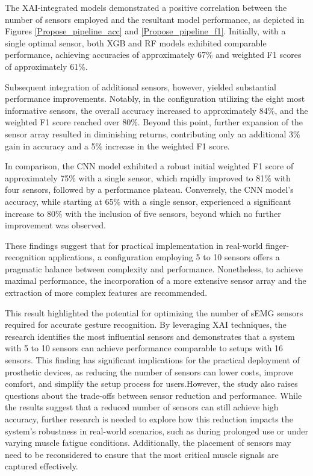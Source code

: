 \documentclass[preprint,12pt]{elsarticle}
\begin{document}
The XAI-integrated models demonstrated a positive correlation between the number of sensors employed and the resultant model performance, as depicted in Figures \ref{Propose_pipeline_acc} and \ref{Propose_pipeline_f1}. Initially, with a single optimal sensor, both XGB and RF models exhibited comparable performance, achieving accuracies of approximately 67\% and weighted F1 scores of approximately 61\%.

Subsequent integration of additional sensors, however, yielded substantial performance improvements. Notably, in the configuration utilizing the eight most informative sensors, the overall accuracy increased to approximately 84\%, and the weighted F1 score reached over 80\%. Beyond this point, further expansion of the sensor array resulted in diminishing returns, contributing only an additional 3\% gain in accuracy and a 5\% increase in the weighted F1 score.

In comparison, the CNN model exhibited a robust initial weighted F1 score of approximately 75\% with a single sensor, which rapidly improved to 81\% with four sensors, followed by a performance plateau. Conversely, the CNN model's accuracy, while starting at 65\% with a single sensor, experienced a significant increase to 80\% with the inclusion of five sensors, beyond which no further improvement was observed.

These findings suggest that for practical implementation in real-world finger-recognition applications, a configuration employing 5 to 10 sensors offers a pragmatic balance between complexity and performance. Nonetheless, to achieve maximal performance, the incorporation of a more extensive sensor array and the extraction of more complex features are recommended.

This result highlighted the potential for optimizing the number of sEMG sensors required for accurate gesture recognition. By leveraging XAI techniques, the research identifies the most influential sensors and demonstrates that a system with 5 to 10 sensors can achieve performance comparable to setups with 16 sensors. This finding has significant implications for the practical deployment of prosthetic devices, as reducing the number of sensors can lower costs, improve comfort, and simplify the setup process for users.However, the study also raises questions about the trade-offs between sensor reduction and performance. While the results suggest that a reduced number of sensors can still achieve high accuracy, further research is needed to explore how this reduction impacts the system's robustness in real-world scenarios, such as during prolonged use or under varying muscle fatigue conditions. Additionally, the placement of sensors may need to be reconsidered to ensure that the most critical muscle signals are captured effectively.
\end{document}
